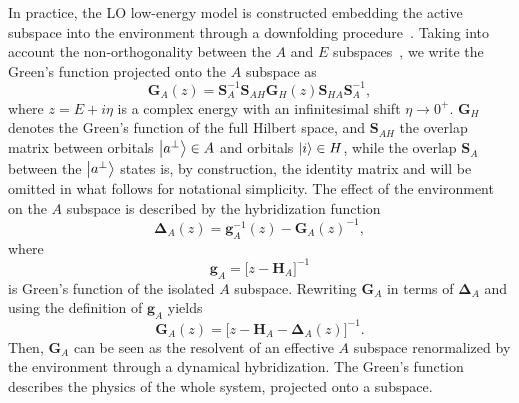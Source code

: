 \documentclass[aps,prx,twocolumn,superscriptaddress]{revtex4-2}
\begin{document}
In practice, the LO low-energy model is constructed embedding the active subspace into the environment through a downfolding procedure~\cite{pavarini2004mott,solovyev2004lattice}.
Taking into account the non-orthogonality between the $A$ and $E$ subspaces~\cite{jacob2015towards}, we write the Green's function projected onto the $A$ subspace as
\begin{equation} \label{eq:GA}
    \mathbf{G}_A(z) = \mathbf{S}^{-1}_{A}\mathbf{S}_{AH} \mathbf{G}_H(z) \mathbf{S}_{HA}\mathbf{S}^{-1}_A,
\end{equation}
where $z=E+i\eta$ is a complex energy with 
an infinitesimal shift $\eta \rightarrow 0^{+}$. $\mathbf{G}_H$ denotes the Green's function of the full Hilbert space, and $\mathbf{S}_{AH}$ the overlap matrix between orbitals $\ket{a^\perp} \in A$ and orbitals $\ket{i} \in H$, 
while the overlap $\mathbf{S}_A$ between the $\ket{a^\perp}$ states is, by construction, the identity matrix and will be omitted in what follows for notational simplicity.
The effect of the environment on the $A$ subspace is described by the hybridization function 
\begin{equation} \label{eq:hybridA}
    \mathbf{\Delta}_A(z) = \mathbf{g}_A^{-1}(z) - \mathbf{G}_A(z)^{-1},
\end{equation}
where
\begin{equation} \label{eq:g0A}
    \mathbf{g}_A = \big[ z-\mathbf{H}_A \big]^{-1}
\end{equation}
is Green's function of the isolated $A$ subspace. Rewriting $\mathbf{G}_A$ in terms of $\mathbf{\Delta}_A$ and using the definition of $\mathbf{g}_A$ yields
\begin{equation} \label{eq:GA_eff}
    \mathbf{G}_A(z) = \big[ z - \mathbf{H}_A - \mathbf{\Delta}_A(z) \big]^{-1}.
\end{equation}
Then, $\mathbf{G}_A$ can be seen as the resolvent of an effective $A$ subspace renormalized by the environment through a dynamical hybridization. The Green's function describes the physics of the whole system, projected onto a subspace. 
\end{document}
